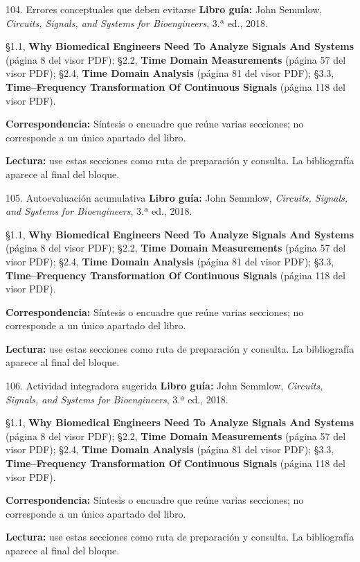 \documentclass[
  10pt,
  ignorenonframetext,
  aspectratio=169,
  spanish,
]{beamer}
\begin{document}
\begin{frame}{104. Errores conceptuales que deben evitarse}
\label{errores-conceptuales-que-deben-evitarse}
\textbf{Libro guía:} John Semmlow, \emph{Circuits, Signals, and Systems
for Bioengineers}, 3.ª ed., 2018.

§1.1, \textbf{Why Biomedical Engineers Need To Analyze Signals And
Systems} (página 8 del visor PDF); §2.2, \textbf{Time Domain
Measurements} (página 57 del visor PDF); §2.4, \textbf{Time Domain
Analysis} (página 81 del visor PDF); §3.3, \textbf{Time--Frequency
Transformation Of Continuous Signals} (página 118 del visor PDF).

\textbf{Correspondencia:} Síntesis o encuadre que reúne varias
secciones; no corresponde a un único apartado del libro.

\textbf{Lectura:} use estas secciones como ruta de preparación y
consulta. La bibliografía aparece al final del bloque.
\end{frame}

\begin{frame}{105. Autoevaluación acumulativa}
\label{autoevaluaciuxf3n-acumulativa}
\textbf{Libro guía:} John Semmlow, \emph{Circuits, Signals, and Systems
for Bioengineers}, 3.ª ed., 2018.

§1.1, \textbf{Why Biomedical Engineers Need To Analyze Signals And
Systems} (página 8 del visor PDF); §2.2, \textbf{Time Domain
Measurements} (página 57 del visor PDF); §2.4, \textbf{Time Domain
Analysis} (página 81 del visor PDF); §3.3, \textbf{Time--Frequency
Transformation Of Continuous Signals} (página 118 del visor PDF).

\textbf{Correspondencia:} Síntesis o encuadre que reúne varias
secciones; no corresponde a un único apartado del libro.

\textbf{Lectura:} use estas secciones como ruta de preparación y
consulta. La bibliografía aparece al final del bloque.
\end{frame}

\begin{frame}{106. Actividad integradora sugerida}
\label{actividad-integradora-sugerida}
\textbf{Libro guía:} John Semmlow, \emph{Circuits, Signals, and Systems
for Bioengineers}, 3.ª ed., 2018.

§1.1, \textbf{Why Biomedical Engineers Need To Analyze Signals And
Systems} (página 8 del visor PDF); §2.2, \textbf{Time Domain
Measurements} (página 57 del visor PDF); §2.4, \textbf{Time Domain
Analysis} (página 81 del visor PDF); §3.3, \textbf{Time--Frequency
Transformation Of Continuous Signals} (página 118 del visor PDF).

\textbf{Correspondencia:} Síntesis o encuadre que reúne varias
secciones; no corresponde a un único apartado del libro.

\textbf{Lectura:} use estas secciones como ruta de preparación y
consulta. La bibliografía aparece al final del bloque.
\end{frame}
\end{document}

